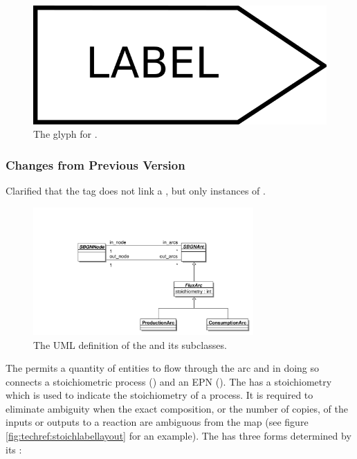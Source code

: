 \begin{figure}[htb]
  \centering
  \includegraphics[scale = 0.3]{images/tag}
  \caption{The \PD glyph for .}
  \label{fig:techref:tag}
\end{figure}

\subsubsection{Changes from Previous Version}

Clarified that the tag does not link a , but
only instances of .

\label{defn:FluxArc}

\begin{figure}[htb]
  \centering
  \includegraphics[width = 0.75\textwidth]{images/fluxarcuml}
  \caption{The UML definition of the  and its subclasses.}
  \label{fig:techref:fluxarcuml}
\end{figure}

The  permits a quantity of entities to flow through
the arc and in doing so connects a stoichiometric process
() and an EPN
(). The  has a
stoichiometry which is used to indicate the stoichiometry of a
process. It is required to eliminate ambiguity when the exact
composition, or the number of copies, of the inputs or outputs to a
reaction are ambiguous from the map (see figure
\ref{fig:techref:stoichlabellayout} for an example). The 
has three forms determined by its :

